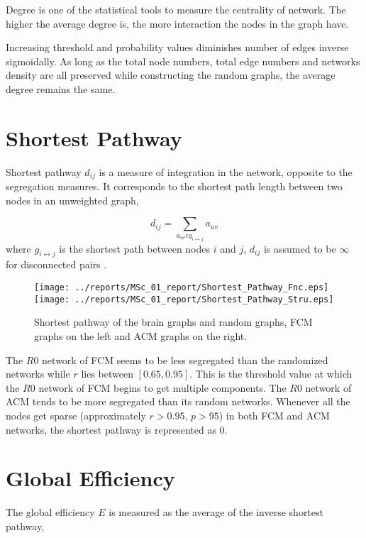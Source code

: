 Degree is one of the statistical tools to measure the centrality of network. The higher the average degree is, the more interaction the nodes in the graph have. 

Increasing threshold and probability values diminishes number of edges inverse sigmoidally. As long as the total node numbers, total edge numbers and networks density are all preserved while constructing the random graphs, the average degree remains the same. 

\section{Shortest Pathway}
Shortest pathway $d_{ij}$ is a measure of integration in the network, opposite to the segregation measures. It corresponds to the shortest path length between two nodes in an unweighted graph,  

\begin{equation}
d_{ij} = \sum\limits_{a_{uv} \epsilon g_{i\leftrightarrow j} } a_{uv}
\end{equation}
where $g_{i\leftrightarrow j}$ is the shortest path between nodes $i$ and $j$, $d_{ij}$ is assumed to be $\infty$ for disconnected pairs \citep{RUB10}.


\begin{figure}[htbp]
 
  \centering
	 \texttt{[image: ../reports/MSc\_01\_report/Shortest\_Pathway\_Fnc.eps]}
	 \texttt{[image: ../reports/MSc\_01\_report/Shortest\_Pathway\_Stru.eps]}
  \caption[Shortest Pathway]{Shortest pathway of the brain graphs and random graphs, FCM graphs on the left and ACM graphs on the right.} 
    \label{fig:Shortest Pathway}
 	
\end{figure}  


The $R0$ network of FCM seems to be less segregated than the randomized networks while $r$ lies between $[0.65,0.95]$. This is the threshold value at which the $R0$ network of FCM begins to get multiple components. The $R0$ network of ACM tends to be more segregated than its random networks. Whenever all the nodes get sparse (approximately $r>0.95$, $p>95$) in both FCM and ACM networks, the shortest pathway is represented as 0. 




\section{Global Efficiency}
The global efficiency $E$ is measured as the average of the inverse shortest pathway,

